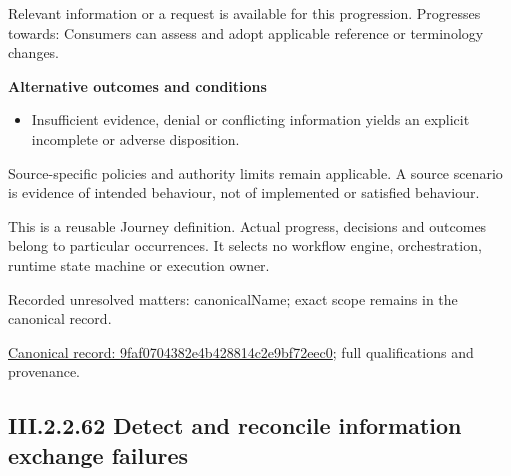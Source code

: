 Relevant information or a request is available for this progression. Progresses towards: Consumers can assess and adopt applicable reference or terminology changes.



\par\medskip\textbf{Alternative outcomes and conditions}\par


\begin{itemize}


\item Insufficient evidence, denial or conflicting information yields an explicit incomplete or adverse disposition.

\end{itemize}


Source-specific policies and authority limits remain applicable. A source scenario is evidence of intended behaviour, not of implemented or satisfied behaviour.



This is a reusable Journey definition. Actual progress, decisions and outcomes belong to particular occurrences. It selects no workflow engine, orchestration, runtime state machine or execution owner.


{\small Recorded unresolved matters: canonicalName; exact scope remains in the canonical record.}\par
{\footnotesize \href{../../../../../../../continuum/strategy/value-stream/9faf0704382e4b428814c2e9bf72eec0.md}{Canonical record: 9faf0704382e4b428814c2e9bf72eec0}; full qualifications and provenance.}\par
\subsection*{III.2.2.62 Detect and reconcile information exchange failures}
\label{navigation:III.2.2.62}


